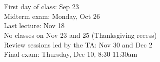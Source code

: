\documentclass[PS]{syllabus}
\newif\ifrelease
\begin{document}
\begin{syllabus}



\clearpage

 \\
\texttt{} \\
\ifrelease\else
First day of class: Sep 23 \\
Midterm exam: Monday, Oct 26 \\
Last lecture: Nov 18 \\
No classes on Nov 23 and 25 (Thanksgiving recess) \\
Review sessions led by the TA: Nov 30 and Dec 2 \\
Final exam: Thursday, Dec 10, 8:30-11:30am
\fi

%


\end{syllabus}
\end{document}
